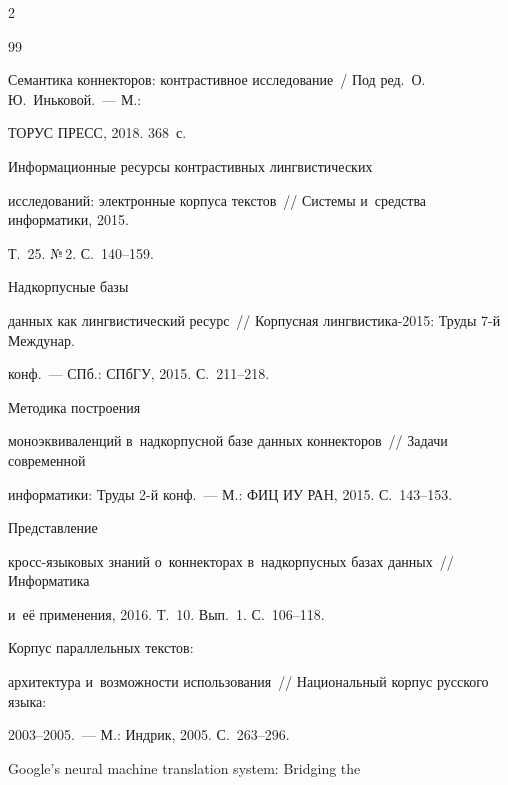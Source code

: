 \begin{multicols}{2}
{{\begin{thebibliography}{99}


Семантика коннекторов: контрастивное исследование~/ Под ред.\ О.\,Ю.~Иньковой.~--- М.: 


ТОРУС ПРЕСС, 2018. 368~с.




 Информационные ресурсы конт\-растивных лингвистических 


исследований: электронные корпуса текстов~// Системы и~средства информатики, 2015. 


Т.~25. №\,2. С.~140--159.




 Надкорпусные базы 


данных как лингвистический ресурс~// Корпусная лингвистика-2015: Труды 7-й Междунар. 


конф.~--- СПб.: СПбГУ, 2015. С.~211--218.




 Методика построения 


моноэквиваленций в~надкорпусной базе данных коннекторов~// Задачи современной 


информатики: Труды 2-й конф.~--- М.: ФИЦ ИУ РАН, 2015. С.~143--153.




 Представление  


кросс-язы\-ко\-вых знаний о~коннекторах в~надкорпусных базах данных~// Информатика 


и~её применения, 2016. Т.~10. Вып.~1. С.~106--118.




 Корпус параллельных текстов: 


архитектура и~возможности использования~// Национальный корпус русского языка:  


2003--2005.~--- М.: Индрик, 2005. С.~263--296.




 Google's neural machine translation system: Bridging the 



\end{thebibliography}}}
\end{multicols}
